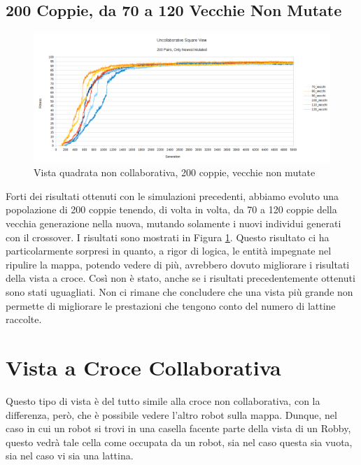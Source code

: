 \subsection{200 Coppie, da 70 a 120 Vecchie Non Mutate}
\begin{figure}[ht]
	\centering
	\includegraphics[scale=0.7,angle=90]{imgs/square_nc_200_pairs_70_120_old_not_mutated.png}
	\caption{Vista quadrata non collaborativa, 200 coppie, vecchie non mutate}
	\label{figure:square_nc_200_70_120_non}
\end{figure}
Forti dei risultati ottenuti con le simulazioni precedenti, abbiamo evoluto una
popolazione di 200 coppie tenendo, di volta in volta, da 70 a 120 coppie della
vecchia generazione nella nuova, mutando solamente i nuovi individui generati
con il crossover.\newline
I risultati sono mostrati in Figura
\ref{figure:square_nc_200_70_120_non}. Questo risultato ci ha particolarmente
sorpresi in quanto, a rigor di logica, le entità impegnate nel ripulire la
mappa, potendo vedere di più, avrebbero dovuto migliorare i risultati della
vista a croce. Così non è stato, anche se i risultati precedentemente ottenuti
sono stati uguagliati. Non ci rimane che concludere che una vista più grande non
permette di migliorare le prestazioni che tengono conto del numero di lattine
raccolte.



\clearpage



\section{Vista a Croce Collaborativa}
Questo tipo di vista è del tutto simile alla croce non collaborativa, con la
differenza, però, che è possibile vedere l'altro robot sulla mappa. Dunque, nel
caso in cui un robot si trovi in una casella facente parte della vista di un
Robby, questo vedrà tale cella come occupata da un robot, sia nel caso questa
sia vuota, sia nel caso vi sia una lattina.

